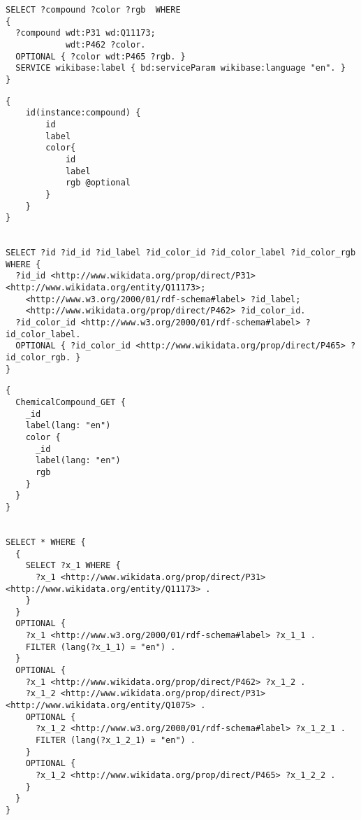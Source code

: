 \begin{minipage}{\linewidth}
\begin{lstlisting}[label=listing:listing37, caption={Query 2}]
SELECT ?compound ?color ?rgb  WHERE
{
  ?compound wdt:P31 wd:Q11173;
            wdt:P462 ?color.
  OPTIONAL { ?color wdt:P465 ?rgb. }
  SERVICE wikibase:label { bd:serviceParam wikibase:language "en". }
}
\end{lstlisting}
\end{minipage}


\begin{minipage}{\linewidth}
\begin{lstlisting}[label=listing:listing38, caption={Query 2 - GraphQL-LD}]
{
    id(instance:compound) {
        id
        label
        color{
            id
            label
            rgb @optional
        }
    }
}


SELECT ?id ?id_id ?id_label ?id_color_id ?id_color_label ?id_color_rgb WHERE {
  ?id_id <http://www.wikidata.org/prop/direct/P31> <http://www.wikidata.org/entity/Q11173>;
    <http://www.w3.org/2000/01/rdf-schema#label> ?id_label;
    <http://www.wikidata.org/prop/direct/P462> ?id_color_id.
  ?id_color_id <http://www.w3.org/2000/01/rdf-schema#label> ?id_color_label.
  OPTIONAL { ?id_color_id <http://www.wikidata.org/prop/direct/P465> ?id_color_rgb. }      
}
\end{lstlisting}
\end{minipage}



\begin{minipage}{\linewidth}
\begin{lstlisting}[label=listing:listing39, caption={Query 2 - HyperGraphQL}]
{
  ChemicalCompound_GET {
    _id
    label(lang: "en")
    color {
      _id
      label(lang: "en")
      rgb
    }
  }
}


SELECT * WHERE { 
  { 
    SELECT ?x_1 WHERE { 
      ?x_1 <http://www.wikidata.org/prop/direct/P31> <http://www.wikidata.org/entity/Q11173> . 
    }  
  }  
  OPTIONAL { 
    ?x_1 <http://www.w3.org/2000/01/rdf-schema#label> ?x_1_1 .
    FILTER (lang(?x_1_1) = "en") .  
  }  
  OPTIONAL { 
    ?x_1 <http://www.wikidata.org/prop/direct/P462> ?x_1_2 .
    ?x_1_2 <http://www.wikidata.org/prop/direct/P31> <http://www.wikidata.org/entity/Q1075> . 
    OPTIONAL { 
      ?x_1_2 <http://www.w3.org/2000/01/rdf-schema#label> ?x_1_2_1 .
      FILTER (lang(?x_1_2_1) = "en") .  
    }  
    OPTIONAL { 
      ?x_1_2 <http://www.wikidata.org/prop/direct/P465> ?x_1_2_2 . 
    }  
  }  
}
\end{lstlisting}
\end{minipage}



